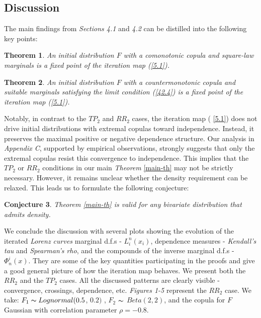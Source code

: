 \documentclass[onecolumn]{article}
\newtheorem{theorem}{Theorem}
\newtheorem{conjecture}[theorem]{Conjecture}
\begin{document}
\subsection{Discussion}

The main findings from \textit{Sections 4.1} and \textit{4.2} can be
distilled into the following key points:

\begin{theorem}
An initial distribution $F$ with a comonotonic copula and square-law
marginals is a fixed point of the iteration map (\ref{5.1}).
\end{theorem}

\begin{theorem}
An initial distribution $F$ with a countermonotonic copula and suitable
marginals satisfying the limit condition (\ref{42.4}) is a fixed point of
the iteration map (\ref{5.1}).
\end{theorem}

Notably, in contrast to the $TP_{2}$ and $RR_{2}$ cases, the iteration map (%
\ref{5.1}) does not drive initial distributions with extremal copulas toward
independence. Instead, it preserves the maximal positive or negative
dependence structure. Our analysis in \textit{Appendix C}, supported by
empirical observations, strongly suggests that only the extremal copulas
resist this convergence to independence. This implies that the $TP_{2}$ or $%
RR_{2}$ conditions in our main \textit{Theorem} \ref{main-th} may not be
strictly necessary. However, it remains unclear whether the density
requirement can be relaxed. This leads us to formulate the following
conjecture:

\begin{conjecture}
\label{conj} \textit{Theorem} \ref{main-th} is valid for any bivariate
distribution that admits density.
\end{conjecture}

We conclude the discussion with several plots showing the evolution of the
iterated \textit{Lorenz curves} marginal d.f.s - $L_{i}^{n}(x_{i})$,
dependence measures - \textit{Kendall's tau} and \textit{Spearman's rho},
and the compounds of the inverse marginal d.f.s - $\Phi _{n}^{i}(x)$. They
are some of the key quantities participating in the proofs and give a good
general picture of how the iteration map behaves. We present both the $%
RR_{2} $ and the $TP_{2}$ cases. All the discussed patterns are clearly
visible - convergence, crossings, dependence, etc. \textit{Figures 1-5}
represent the $RR_{2}$ case. We take: $F_{1}\thicksim Lognormal(0.5$, $0.2)$%
, $F_{2}$ $\thicksim $ $Beta(2,2)$, and the copula for $F$ Gaussian with
correlation parameter $\rho =-0.8$.
\end{document}
